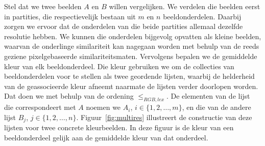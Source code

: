 Stel dat we twee beelden $A$ en $B$ willen
vergelijken. We verdelen
die beelden eerst in partities, die respectievelijk bestaan uit
$m$ en $n$ beeldonderdelen. Daarbij zorgen we ervoor dat de onderdelen
van die beide partities allemaal dezelfde resolutie hebben. We kunnen die onderdelen bijgevolg 
opvatten als kleine beelden, waarvan de onderlinge similariteit kan nagegaan worden met behulp van de reeds 
geziene pixelgebaseerde similariteitsmaten.
Vervolgens bepalen we de gemiddelde kleur van elk beeldonderdeel. Die kleur gebruiken we om
de collecties van beeldonderdelen voor te stellen als twee geordende lijsten, waarbij de 
helderheid van de geassocieerde kleur afneemt naarmate de lijsten verder doorlopen worden.
Dat doen we met behulp van de ordening $\leq_{RGB,lex}$. 
De elementen van de lijst die correspondeert met $A$ noemen 
we $A_i$, $i \in \{1,2,\ldots,m\}$, en die van de andere lijst $B_j$, $j \in \{1,2,\ldots,n\}$.
Figuur~\ref{fig:multires} illustreert de constructie van deze lijsten voor twee concrete
kleurbeelden. In deze figuur is de kleur van een beeldonderdeel gelijk aan de gemiddelde 
kleur van dat onderdeel.

